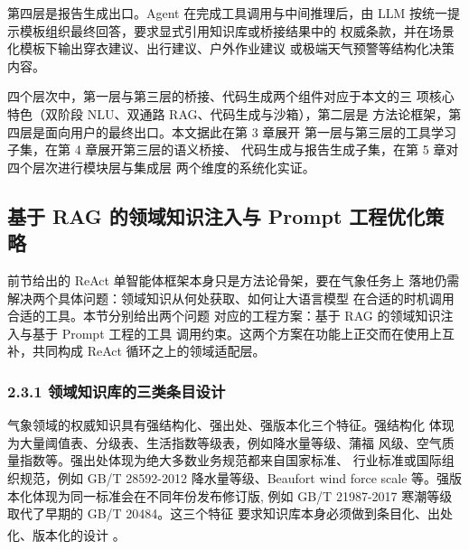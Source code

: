 \documentclass[a4paper]{article}
\theoremstyle{definition}
\theoremstyle{plain}
\theoremstyle{remark}
\newcommand{\reftab}[1]{表 \ref{#1}}
\let\oldcite\cite
\renewcommand{\cite}[1]{\textsuperscript{\oldcite{#1}}}
\begin{document}
第四层是报告生成出口。Agent 在完成工具调用与中间推理后，由 LLM
按统一提示模板组织最终回答，要求显式引用知识库或桥接结果中的
权威条款，并在场景化模板下输出穿衣建议、出行建议、户外作业建议
或极端天气预警等结构化决策内容。

四个层次中，第一层与第三层的桥接、代码生成两个组件对应于本文的三
项核心特色（双阶段 NLU、双通路 RAG、代码生成与沙箱），第二层是
方法论框架，第四层是面向用户的最终出口。本文据此在第 3 章展开
第一层与第三层的工具学习子集，在第 4 章展开第三层的语义桥接、
代码生成与报告生成子集，在第 5 章对四个层次进行模块层与集成层
两个维度的系统化实证。




\subsection{基于 RAG 的领域知识注入与 Prompt 工程优化策略}
\label{sec:rag-prompt}

前节给出的 ReAct 单智能体框架本身只是方法论骨架，要在气象任务上
落地仍需解决两个具体问题：领域知识从何处获取、如何让大语言模型
在合适的时机调用合适的工具。本节分别给出两个问题
对应的工程方案：基于 RAG 的领域知识注入与基于 Prompt 工程的工具
调用约束。这两个方案在功能上正交而在使用上互补，共同构成 ReAct
循环之上的领域适配层。

\subsubsection*{2.3.1 \quad 领域知识库的三类条目设计}

气象领域的权威知识具有强结构化、强出处、强版本化三个特征。强结构化
体现为大量阈值表、分级表、生活指数等级表，例如降水量等级、蒲福
风级、空气质量指数等。强出处体现为绝大多数业务规范都来自国家标准、
行业标准或国际组织规范，例如 GB/T 28592-2012 降水量等级、Beaufort
wind force scale 等。强版本化体现为同一标准会在不同年份发布修订版,
例如 GB/T 21987-2017 寒潮等级取代了早期的 GB/T 20484。这三个特征
要求知识库本身必须做到条目化、出处化、版本化的设计 \cite{ref24}。
\end{document}
